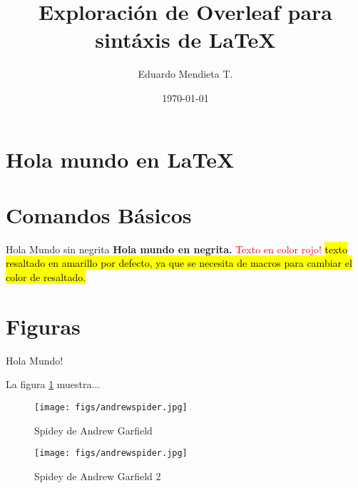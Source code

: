 \documentclass[12pt]{article} %
\title{Exploración de Overleaf para sintáxis de \LaTeX} %
\author{Eduardo Mendieta T.} %
\date{\today} %
\begin{document}
\tableofcontents %
\listoffigures
\listoftables

\maketitle %

\section{Hola mundo en \LaTeX}

\section{Comandos Básicos}
Hola Mundo sin negrita \textbf{Hola mundo en negrita.} \textcolor{red}{Texto en color rojo!} \hl{texto resaltado en amarillo por defecto, ya que se necesita de macros para cambiar el color de resaltado.}

\section{Figuras}
Hola Mundo!

La figura \ref{fig:spideyandrew} muestra...

\begin{figure}[!h]  %
    \centering
    \texttt{[image: figs/andrewspider.jpg]}
    \caption{Spidey de Andrew Garfield}
    \label{fig:spideyandrew}
\end{figure}

\begin{figure}[!h]  %
    \centering
    \texttt{[image: figs/andrewspider.jpg]}
    \caption{Spidey de Andrew Garfield 2}
    \label{fig:spideyandrew2}
\end{figure}
\end{document}
